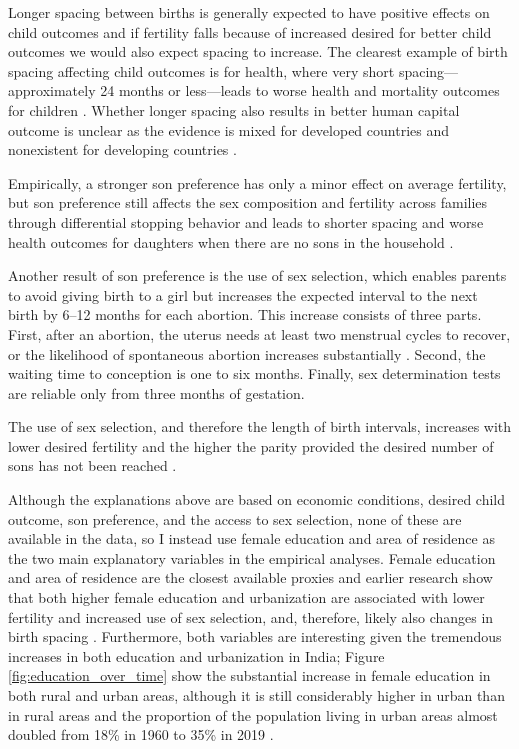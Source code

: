 Longer spacing between births is generally expected to have positive effects on 
child outcomes and if fertility falls because of increased desired for better child
outcomes we would also expect spacing to increase.
The clearest example of birth spacing affecting child outcomes is for health,
where very short spacing---approximately 24 months or less---leads to worse health 
and mortality outcomes for children 
\citep{Whitworth2002,Conde-Agudelo2012}.
Whether longer spacing also results in better human capital outcome is unclear as the 
evidence is mixed for developed countries and nonexistent for developing countries
\citep{Zajonc1976,Powell1993,Pettersson-Lidbom2009,Buckles2012,Barclay2017}.


Empirically, a stronger son preference has only a minor effect on average fertility, but
son preference still affects the sex composition and fertility across families through 
differential stopping behavior and leads to shorter spacing and  worse health outcomes for 
daughters when there are no sons in the household 
\citep{repetto72,clark00,Whitworth2002,Basu2010,Jayachandran2011,Barcellos2014}.
 
Another result of son preference is the use of sex selection, which enables parents to 
avoid giving birth to a girl but increases the expected interval to the next birth
by 6--12 months for each abortion.
This increase consists of three parts. 
First, after an abortion, the uterus needs at least two menstrual cycles to recover, 
or the likelihood of spontaneous abortion increases substantially \citep{zhou00b}. 
Second, the waiting time to conception is one to six months. 
Finally, sex determination tests are reliable only from three months of gestation. 

The use of sex selection, and therefore the length of birth intervals, increases with
lower desired fertility and the higher the parity provided the desired number of sons has 
not been reached \citep{Portner2015b,Jayachandran2017}.  


Although the explanations above are based on economic conditions, desired child outcome,
son preference, and the access to sex selection, none of these are available in the
data, so I instead use female education and area of residence as the two main explanatory 
variables in the empirical analyses.
Female education and area of residence are the closest available proxies and earlier 
research show that both higher female education and urbanization are associated with 
lower fertility and increased use of sex selection, and, therefore, likely also changes 
in birth spacing
\citep{das_gupta97,dreze01,bhat03,retherford03b,Guilmoto2009a,Portner2015b,Jayachandran2017}.
Furthermore, both variables are interesting given the tremendous increases in 
both education and urbanization in India; 
Figure \ref{fig:education_over_time} show the substantial increase in female education
in both rural and urban areas, although it is still considerably higher in urban than in 
rural areas and the proportion of the population living in urban areas almost doubled from 
18\% in 1960 to 35\% in 2019 \citep{United-Nations2019}.

